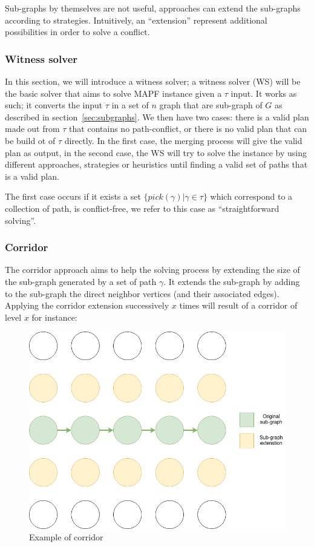 Sub-graphs by themselves are not useful, approaches can extend the sub-graphs according to strategies. Intuitively, an ``extension'' represent additional possibilities in order to solve a conflict. 

\subsubsection{Witness solver}

In this section, we will introduce a witness solver; a witness solver (WS) will be the basic solver that aims to solve MAPF instance given a \(\tau\) input. It works as such; it converts the input \(\tau\) in a set of \(n\) graph that are sub-graph of \(G\) as described in section~\ref{sec:subgraphs}. We then have two cases: there is a valid plan made out from \(\tau\) that contains no path-conflict, or there is no valid plan that can be build ot of \(\tau\) directly. In the first case, the merging process will give the valid plan as output, in the second case, the WS will try to solve the instance by using different approaches, strategies or heuristics until finding a valid set of paths that is a valid plan.

The first case occurs if it exists a set \(\{pick(\gamma) | \gamma \in \tau\}\) which correspond to a collection of path, is conflict-free, we refer to this case as ``straightforward solving''. 

\subsubsection{Corridor}\label{sec:corridor}

The corridor approach aims to help the solving process by extending the size of the sub-graph generated by a set of path \(\gamma\). It extends the sub-graph by adding to the sub-graph the direct neighbor vertices (and their associated edges). Applying the corridor extension successively \(x\) times will result of a corridor of level \(x\) for instance:  
\begin{figure}[H]
  \centering
  \caption{Example of corridor}\label{img:corridor}
  \includegraphics[width=\widthimg]{img/corridor.drawio}
\end{figure}

